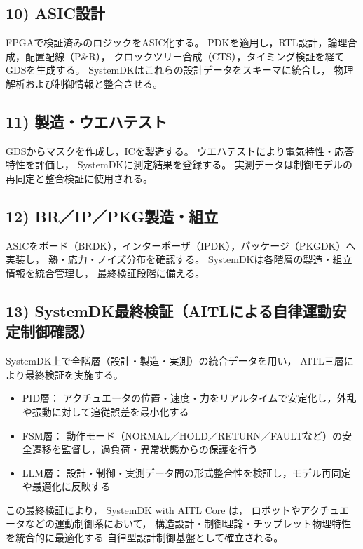 \subsection{10) ASIC設計}
FPGAで検証済みのロジックをASIC化する。
PDKを適用し，RTL設計，論理合成，配置配線（P\&R），
クロックツリー合成（CTS），タイミング検証を経てGDSを生成する。
SystemDKはこれらの設計データをスキーマに統合し，
物理解析および制御情報と整合させる。

\subsection{11) 製造・ウエハテスト}
GDSからマスクを作成し，ICを製造する。
ウエハテストにより電気特性・応答特性を評価し，
SystemDKに測定結果を登録する。
実測データは制御モデルの再同定と整合検証に使用される。

\subsection{12) BR／IP／PKG製造・組立}
ASICをボード（BRDK），インターポーザ（IPDK），パッケージ（PKGDK）へ実装し，
熱・応力・ノイズ分布を確認する。
SystemDKは各階層の製造・組立情報を統合管理し，
最終検証段階に備える。

\subsection{13) SystemDK最終検証（AITLによる自律運動安定制御確認）}
SystemDK上で全階層（設計・製造・実測）の統合データを用い，
AITL三層により最終検証を実施する。

\begin{itemize}
  \item PID層： アクチュエータの位置・速度・力をリアルタイムで安定化し，外乱や振動に対して追従誤差を最小化する  
  \item FSM層： 動作モード（NORMAL／HOLD／RETURN／FAULTなど）の安全遷移を監督し，過負荷・異常状態からの保護を行う  
  \item LLM層： 設計・制御・実測データ間の形式整合性を検証し，モデル再同定や最適化に反映する  
\end{itemize}

この最終検証により，
SystemDK with AITL Core は，
ロボットやアクチュエータなどの運動制御系において，
構造設計・制御理論・チップレット物理特性を統合的に最適化する
自律型設計制御基盤として確立される。

